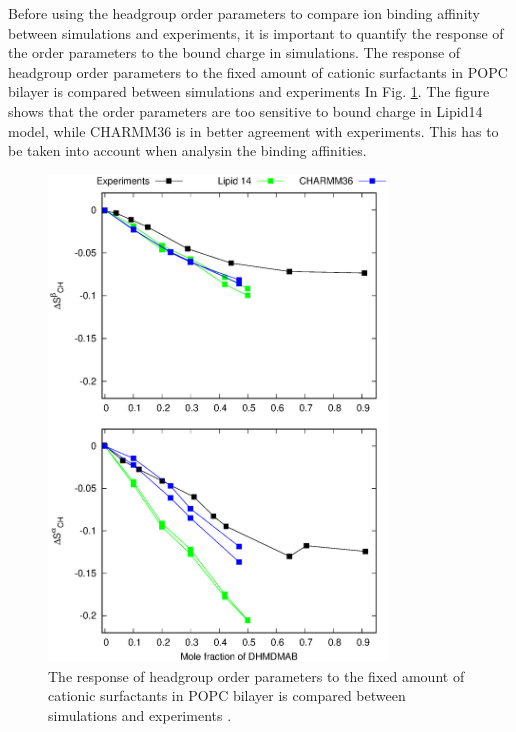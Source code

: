 \documentclass[aps,prl,superscriptaddress,twocolumn]{revtex4}
\begin{document}
Before using the headgroup order parameters to compare ion binding affinity between simulations
and experiments, it is important to quantify the response of the order parameters to the
bound charge in simulations.
The response of headgroup order parameters to the fixed amount of cationic surfactants in
POPC bilayer is compared between simulations and experiments \cite{scherer89} In Fig. \ref{CHANGESwithCaClPGPS}.
The figure shows that the order parameters are too sensitive to bound charge in Lipid14 model,
while CHARMM36 is in better agreement with experiments. This has to be taken into account when
analysin the binding affinities.
\begin{figure}[]
  \centering
  \includegraphics[width=9.0cm]{../Figs/HGopsDHMDMAB.eps}
  \caption{\label{CHANGESwithCaClPGPS}
  The response of headgroup order parameters to the fixed amount of cationic surfactants in
  POPC bilayer is compared between simulations and experiments \cite{scherer89}.}
\end{figure}
\end{document}
